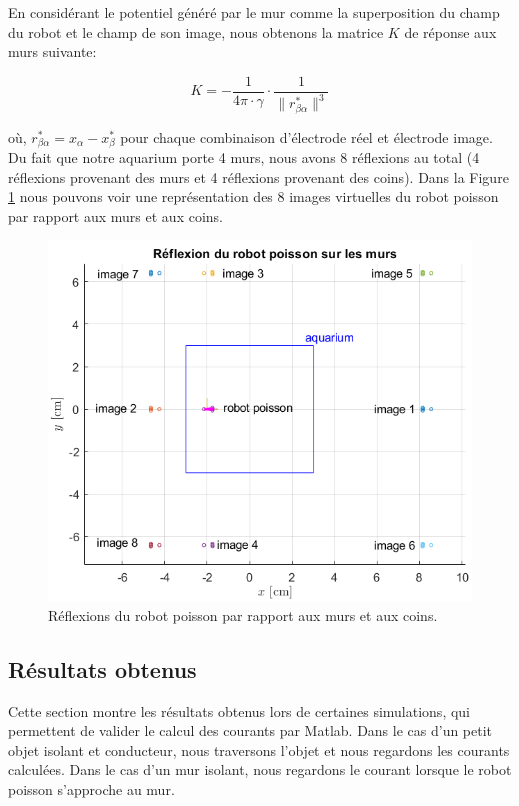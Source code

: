 En considérant le potentiel généré par le mur comme la superposition du champ du robot et le champ de son image, nous obtenons la matrice $K$ de réponse aux murs suivante: 

\begin{equation}
    K = - \frac{1}{4\pi \cdot \gamma} \cdot \frac{1}{\lVert r_{\beta\alpha}^* \rVert^3}
\end{equation}

où, $r_{\beta\alpha}^* = x_\alpha - x_\beta^*$ pour chaque combinaison d'électrode réel et électrode image. Du fait que notre aquarium porte 4 murs, nous avons 8 réflexions au total (4 réflexions provenant des murs et 4 réflexions provenant des coins). Dans la Figure \ref{fig:wall_reflexion} nous pouvons voir une représentation des 8 images virtuelles du robot poisson par rapport aux murs et aux coins. 

\begin{figure}
    \centering
    \includegraphics[scale=0.8]{assets/wall_reflexions/wall_reflexion.png}
    \caption{Réflexions du robot poisson par rapport aux murs et aux coins.}
    \label{fig:wall_reflexion}
\end{figure}
\clearpage

\subsection{Résultats obtenus}
Cette section montre les résultats obtenus lors de certaines simulations, qui permettent de valider le calcul des courants par Matlab. Dans le cas d'un petit objet isolant et conducteur, nous traversons l'objet et nous regardons les courants calculées. Dans le cas d'un mur isolant, nous regardons le courant lorsque le robot poisson s'approche au mur. 

